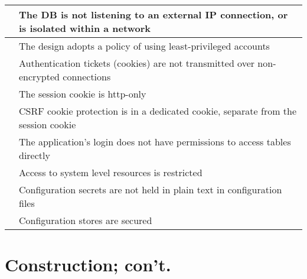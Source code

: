 \documentclass{article}
\begin{document}
\begin{center}
\begin{tabular}{ | p{.25cm} || p{10cm} |}
     & The DB is not listening to an external IP connection, or is isolated within a network \\ \hline
     & The design adopts a policy of using least-privileged accounts \\ \hline
     & Authentication tickets (cookies) are not transmitted over non-encrypted connections \\ \hline
     & The session cookie is http-only \\ \hline
     & CSRF cookie protection is in a dedicated cookie, separate from the session cookie \\ \hline
     & The application's login does not have permissions to access tables directly \\ \hline
     & Access to system level resources is restricted \\ \hline
     & Configuration secrets are not held in plain text in configuration files \\ \hline
     & Configuration stores are secured \\ \hline
    \end{tabular}
\end{center}

\section{Construction; con't.}
\end{document}
